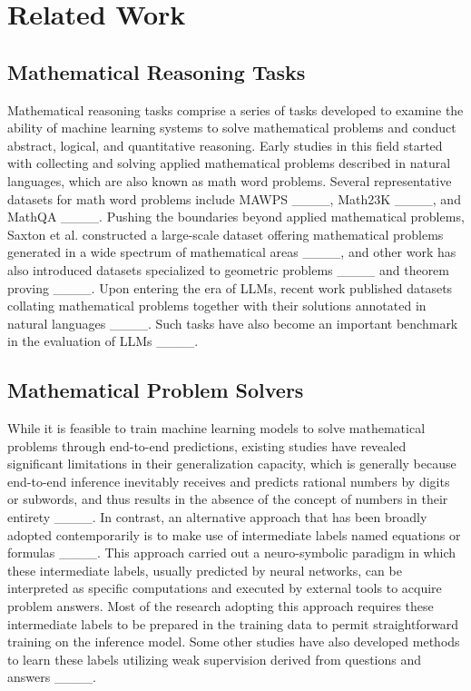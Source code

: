 \section{Related Work}
\subsection{Mathematical Reasoning Tasks}

Mathematical reasoning tasks comprise a series of tasks developed to examine the ability of machine learning systems to solve mathematical problems and conduct abstract, logical, and quantitative reasoning.
Early studies in this field started with collecting and solving applied mathematical problems described in natural languages, which are also known as math word problems.
Several representative datasets for math word problems include MAWPS ____, Math23K ____, and MathQA ____.
Pushing the boundaries beyond applied mathematical problems, 
Saxton et al. constructed a large-scale dataset offering mathematical problems generated in a wide spectrum of mathematical areas ____,
and other work has also introduced datasets specialized to geometric problems ____ and theorem proving ____.
Upon entering the era of LLMs, recent work published datasets collating mathematical problems together with their solutions annotated in natural languages ____.
Such tasks have also become an important benchmark in the evaluation of LLMs ____.

\subsection{Mathematical Problem Solvers}

While it is feasible to train machine learning models to solve mathematical problems through end-to-end predictions, 
existing studies have revealed significant limitations in their generalization capacity,
which is generally because end-to-end inference inevitably receives and predicts rational numbers by digits or subwords, and thus results in the absence of the concept of numbers in their entirety ____.
In contrast, an alternative approach that has been broadly adopted contemporarily is to make use of intermediate labels named equations or formulas ____.
This approach carried out a neuro-symbolic paradigm in which these intermediate labels, usually predicted by neural networks, can be interpreted as specific computations and executed by external tools to acquire problem answers.
Most of the research adopting this approach requires these intermediate labels to be prepared in the training data to permit straightforward training on the inference model.
Some other studies have also developed methods to learn these labels utilizing weak supervision derived from questions and answers ____.


